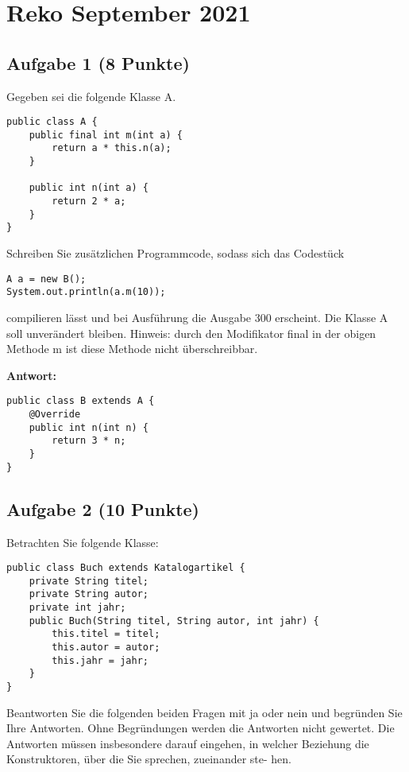 \chapter{Reko September 2021}

\section{Aufgabe 1 (8 Punkte)}

Gegeben sei die folgende Klasse A.

\begin{lstlisting}
public class A {
    public final int m(int a) {
        return a * this.n(a);
    }

    public int n(int a) {
        return 2 * a;
    }
}
\end{lstlisting}

Schreiben Sie zusätzlichen Programmcode, sodass sich das Codestück

\begin{lstlisting}
A a = new B();
System.out.println(a.m(10));
\end{lstlisting}

compilieren lässt und bei Ausführung die Ausgabe 300 erscheint. Die Klasse A
soll unverändert bleiben. Hinweis: durch den Modifikator final in der obigen
Methode m ist diese Methode nicht überschreibbar.

\textbf{Antwort:}

\begin{lstlisting}
public class B extends A {
    @Override
    public int n(int n) {
        return 3 * n;
    }
}
\end{lstlisting}

\section{Aufgabe 2 (10 Punkte)}

Betrachten Sie folgende Klasse:

\begin{lstlisting}
public class Buch extends Katalogartikel {
    private String titel;
    private String autor;
    private int jahr;
    public Buch(String titel, String autor, int jahr) {
        this.titel = titel;
        this.autor = autor;
        this.jahr = jahr;
    }
}
\end{lstlisting}

Beantworten Sie die folgenden beiden Fragen mit ja oder nein und begründen Sie
Ihre Antworten. Ohne Begründungen werden die Antworten nicht gewertet. Die
Antworten müssen insbesondere darauf eingehen, in welcher Beziehung die
Konstruktoren, über die Sie sprechen, zueinander ste- hen.

